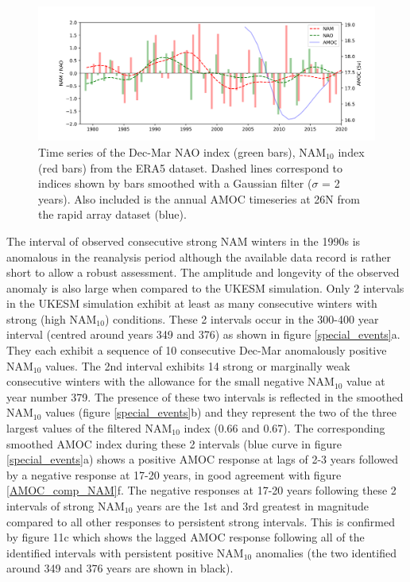 \begin{figure}[h!]
\begin{center}
\noindent\includegraphics[width = 0.9\linewidth]{Figures/Figures-surface/ERA5_series_allf.png} \caption{Time series of the Dec-Mar NAO index (green bars), NAM$_{10}$ index (red bars) from the ERA5 dataset. Dashed lines correspond to indices shown by bars smoothed with a Gaussian filter ($\sigma$ = 2 years). Also included is the annual AMOC timeseries at 26N from the rapid array dataset (blue).}
\label{ERA5_series}
\end{center}
\end{figure}

The interval of observed consecutive strong NAM winters in the 1990s is anomalous in the reanalysis period  although the available data record is rather short to allow a robust assessment. The amplitude and longevity of the observed anomaly is also large when compared to the UKESM simulation. Only 2 intervals in the UKESM simulation exhibit at least as many consecutive winters with strong (high NAM$_{10}$) conditions. These 2 intervals occur in the 300-400 year interval (centred around years 349 and 376) as shown in figure \ref{special_events}a. They each exhibit a sequence of 10 consecutive Dec-Mar anomalously positive NAM$_{10}$ values. The 2nd interval exhibits 14 strong or marginally weak consecutive winters with the allowance for the small negative NAM$_{10}$ value at year number 379. The presence of these two intervals is reflected in the smoothed NAM$_{10}$ values (figure \ref{special_events}b) and they represent the two of the three largest values of the filtered NAM$_{10}$ index (0.66 and 0.67). The corresponding smoothed AMOC index during these 2 intervals (blue curve in figure \ref{special_events}a) shows a positive AMOC response at lags of 2-3 years followed by a negative response at 17-20 years, in good agreement with figure \ref{AMOC_comp_NAM}f. The negative responses at 17-20 years following these 2 intervals of strong NAM$_{10}$ years are the 1st and 3rd greatest in magnitude compared to all other responses to persistent strong intervals. This is confirmed by figure 11c which shows the lagged AMOC response following all of the identified intervals with persistent positive NAM$_{10}$ anomalies (the two identified around 349 and 376 years are shown in black). 

